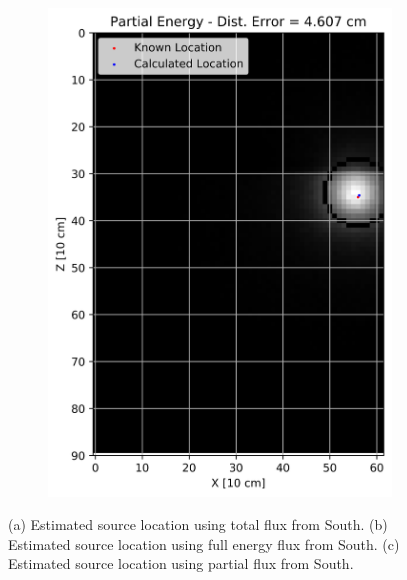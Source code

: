 \begin{figure}[!htb]
\begin{subfigure}[b]{0.15\textwidth}
   \includegraphics[width=1\linewidth]{images/2Cent_Part_2fl_Wall_S}
   \caption{}
   \label{fig:RanP2W}
\end{subfigure}
\caption{(a) Estimated source location using total flux from South. (b) Estimated source location using full energy flux from South. (c) Estimated source location using partial flux from South.}
\end{figure}

